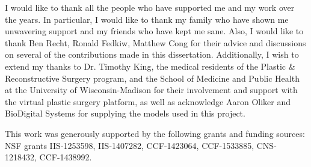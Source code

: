 
I would like to thank all the people who have
supported me and my work over the years. In
particular, I would like to thank my family who
have shown me unwavering support and my friends
who have kept me sane. Also, I would like to thank
Ben Recht, Ronald Fedkiw, Matthew Cong for their
advice and discussions on several of the
contributions made in this
dissertation. Additionally, I wish to extend my
thanks to Dr. Timothy King, the medical residents
of the Plastic \& Reconstructive Surgery program,
and the School of Medicine and Public Health at
the University of Wisconsin-Madison for their
involvement and support with the virtual plastic
surgery platform, as well as acknowledge Aaron
Oliker and BioDigital Systems for supplying the
models used in this project.

This work was generously supported by the following grants
and funding sources: NSF grants IIS-1253598,
IIS-1407282, CCF-1423064, CCF-1533885,
CNS-1218432, CCF-1438992.


